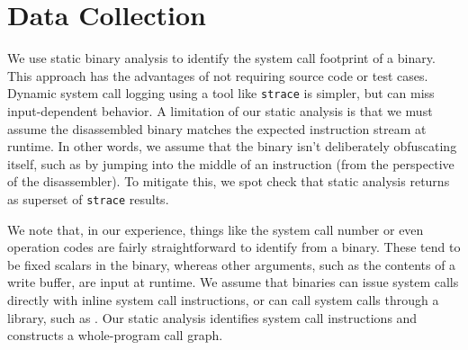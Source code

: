 \section{Data Collection}
\label{sec:measure:analysis}

We use static binary analysis to identify the system call footprint of a binary.  This approach has the advantages
of not requiring source code or test cases.  Dynamic system call logging using a tool like {\tt strace} is simpler,
but can miss input-dependent behavior.  A limitation of our static analysis is that we must assume the disassembled binary
matches the expected instruction stream at runtime.  In other words, we assume that the binary isn't deliberately obfuscating
itself, such as by jumping into the middle of an instruction (from the perspective of the disassembler).
To mitigate this, we spot check that static analysis returns as superset of {\tt strace} results.

We note that, in our experience, things like the system call number or even operation codes are fairly straightforward
to identify from a binary.  These tend to be fixed scalars in the binary, whereas other arguments, such as the contents of a write buffer,
are input at runtime.
We assume that binaries can issue system calls directly with inline system call instructions, or can call system calls through a library, such as \libc{}.
Our static analysis identifies system call instructions and constructs a whole-program call graph.

